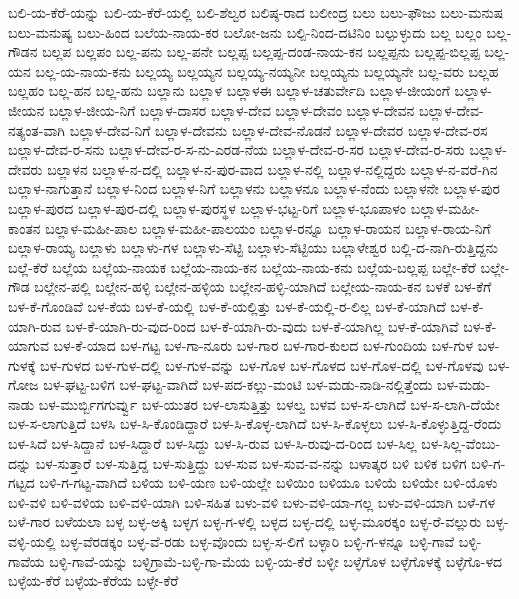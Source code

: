 ಬಲಿ-ಯ-ಕೆರೆ-ಯನ್ನು
ಬಲಿ-ಯ-ಕೆರೆ-ಯಲ್ಲಿ
ಬಲಿ-ಶೆಲ್ವರ
ಬಲಿಷ್ಠ-ರಾದ
ಬಲೀಂದ್ರ
ಬಲು
ಬಲು-ಫೌಜು
ಬಲು-ಮನುಷ
ಬಲು-ಮನುಷ್ಯ
ಬಲು-ಹಿಂದ
ಬಲೆಯ-ನಾಯ-ಕರ
ಬಲೋ-ಜನು
ಬಲ್ಪಿ-ನಿಂದ-ದಟಿನಿಂ
ಬಲ್ಪುಳ್ಳುದು
ಬಲ್ಲ
ಬಲ್ಲಂ
ಬಲ್ಲ-ಗೌಡನ
ಬಲ್ಲಪ
ಬಲ್ಲಪಂ
ಬಲ್ಲ-ಪನು
ಬಲ್ಲ-ಪನೇ
ಬಲ್ಲಪ್ಪ
ಬಲ್ಲಪ್ಪ-ದಂಡ-ನಾಯ-ಕನ
ಬಲ್ಲಪ್ಪನು
ಬಲ್ಲಪ್ಪ-ಬಿಲ್ಲಪ್ಪ
ಬಲ್ಲ-ಯನ
ಬಲ್ಲ-ಯ-ನಾಯ-ಕನು
ಬಲ್ಲಯ್ಯ
ಬಲ್ಲಯ್ಯನ
ಬಲ್ಲಯ್ಯ-ನಯ್ಯನೀ
ಬಲ್ಲಯ್ಯನು
ಬಲ್ಲಯ್ಯನೇ
ಬಲ್ಲ-ವರು
ಬಲ್ಲಹ
ಬಲ್ಲಹಂ
ಬಲ್ಲ-ಹನ
ಬಲ್ಲ-ಹನು
ಬಲ್ಲಾನು
ಬಲ್ಲಾಳ
ಬಲ್ಲಾಳಈ
ಬಲ್ಲಾಳ-ಚತುರ್ವೇದಿ
ಬಲ್ಲಾಳ-ಜೀಯಂಗೆ
ಬಲ್ಲಾಳ-ಜೀಯನ
ಬಲ್ಲಾಳ-ಜೀಯ-ನಿಗೆ
ಬಲ್ಲಾಳ-ದಾಸರ
ಬಲ್ಲಾಳ-ದೇವ
ಬಲ್ಲಾಳ-ದೇವಂ
ಬಲ್ಲಾಳ-ದೇವನ
ಬಲ್ಲಾಳ-ದೇವ-ನತ್ಯಂತ-ವಾಗಿ
ಬಲ್ಲಾಳ-ದೇವ-ನಿಗೆ
ಬಲ್ಲಾಳ-ದೇವನು
ಬಲ್ಲಾಳ-ದೇವ-ನೊಡನೆ
ಬಲ್ಲಾಳ-ದೇವರ
ಬಲ್ಲಾಳ-ದೇವ-ರಸ
ಬಲ್ಲಾಳ-ದೇವ-ರ-ಸನು
ಬಲ್ಲಾಳ-ದೇವ-ರ-ಸ-ನು-ಎರಡ-ನೆಯ
ಬಲ್ಲಾಳ-ದೇವ-ರ-ಸರ
ಬಲ್ಲಾಳ-ದೇವ-ರ-ಸರು
ಬಲ್ಲಾಳ-ದೇವರು
ಬಲ್ಲಾಳನ
ಬಲ್ಲಾಳ-ನ-ದಲ್ಲಿ
ಬಲ್ಲಾಳ-ನ-ಪುರ-ವಾದ
ಬಲ್ಲಾಳ-ನಲ್ಲಿ
ಬಲ್ಲಾಳ-ನಲ್ಲಿದ್ದರು
ಬಲ್ಲಾಳ-ನ-ವರೆ-ಗಿನ
ಬಲ್ಲಾಳ-ನಾಗುತ್ತಾನೆ
ಬಲ್ಲಾಳ-ನಿಂದ
ಬಲ್ಲಾಳ-ನಿಗೆ
ಬಲ್ಲಾಳನು
ಬಲ್ಲಾಳನೂ
ಬಲ್ಲಾಳ-ನೆಂದು
ಬಲ್ಲಾಳನೇ
ಬಲ್ಲಾಳ-ಪುರ
ಬಲ್ಲಾಳ-ಪುರದ
ಬಲ್ಲಾಳ-ಪುರ-ದಲ್ಲಿ
ಬಲ್ಲಾಳ-ಪುರಸ್ಥಳ
ಬಲ್ಲಾಳ-ಭಟ್ಟ-ರಿಗೆ
ಬಲ್ಲಾಳ-ಭೂಪಾಳಂ
ಬಲ್ಲಾಳ-ಮಹೀ-ಕಾಂತನ
ಬಲ್ಲಾಳ-ಮಹೀ-ಪಾಲ
ಬಲ್ಲಾಳ-ಮಹೀ-ಪಾಲಯಂ
ಬಲ್ಲಾಳ-ರನ್ನೂ
ಬಲ್ಲಾಳ-ರಾಯನ
ಬಲ್ಲಾಳ-ರಾಯ-ನಿಗೆ
ಬಲ್ಲಾಳ-ರಾಯ್ಯ
ಬಲ್ಲಾಳು
ಬಲ್ಲಾಳು-ಗಳ
ಬಲ್ಲಾಳು-ಸೆಟ್ಟಿ
ಬಲ್ಲಾಳು-ಸೆಟ್ಟಿಯು
ಬಲ್ಲಾಳೇಶ್ವರ
ಬಲ್ಲಿ-ದ-ನಾಗಿ-ರುತ್ತಿದ್ದನು
ಬಲ್ಲೆ-ಕೆರೆ
ಬಲ್ಲೆಯ
ಬಲ್ಲೆಯ-ನಾಯಕ
ಬಲ್ಲೆಯ-ನಾಯ-ಕನ
ಬಲ್ಲೆಯ-ನಾಯ-ಕನು
ಬಲ್ಲೆಯ-ಬಲ್ಲಪ್ಪ
ಬಲ್ಲೇ-ಕೆರೆ
ಬಲ್ಲೇ-ಗೌಡ
ಬಲ್ಲೇನ-ಪಲ್ಲಿ
ಬಲ್ಲೇನ-ಹಳ್ಳಿ
ಬಲ್ಲೇನ-ಹಳ್ಳಿಯ
ಬಲ್ಲೇನ-ಹಳ್ಳಿ-ಯಾಗಿದೆ
ಬಲ್ಲೇಯ-ನಾಯ-ಕನ
ಬಳಕೆ
ಬಳ-ಕೆಗೆ
ಬಳ-ಕೆ-ಗೊಂಡಿವೆ
ಬಳ-ಕೆಯ
ಬಳ-ಕೆ-ಯಲ್ಲಿ
ಬಳ-ಕೆ-ಯಲ್ಲಿತ್ತು
ಬಳ-ಕೆ-ಯಲ್ಲಿ-ರ-ಲಿಲ್ಲ
ಬಳ-ಕೆ-ಯಾಗಿದೆ
ಬಳ-ಕೆ-ಯಾಗಿ-ರುವ
ಬಳ-ಕೆ-ಯಾಗಿ-ರು-ವುದ-ರಿಂದ
ಬಳ-ಕೆ-ಯಾಗಿ-ರು-ವುದು
ಬಳ-ಕೆ-ಯಾಗಿಲ್ಲ
ಬಳ-ಕೆ-ಯಾಗಿವೆ
ಬಳ-ಕೆ-ಯಾಗುವ
ಬಳ-ಕೆ-ಯಾದ
ಬಳ-ಗಟ್ಟ
ಬಳ-ಗಾ-ನೂರು
ಬಳ-ಗಾರ
ಬಳ-ಗಾರ-ಕುಲದ
ಬಳ-ಗುಂದಿಯ
ಬಳ-ಗುಳ
ಬಳ-ಗುಳಕ್ಕೆ
ಬಳ-ಗುಳದ
ಬಳ-ಗುಳ-ದಲ್ಲಿ
ಬಳ-ಗುಳ-ವನ್ನು
ಬಳ-ಗೊಳ
ಬಳ-ಗೊಳದ
ಬಳ-ಗೊಳ-ದಲ್ಲಿ
ಬಳ-ಗೊಳವು
ಬಳ-ಗೋಜ
ಬಳ-ಘಟ್ಟ-ಬಳಿಗ
ಬಳ-ಘಟ್ಟ-ವಾಗಿದೆ
ಬಳ-ಪದ-ಕಲ್ಲು-ಮಂಟಿ
ಬಳ-ಮಡು-ನಾಡಿ-ನಲ್ಲಿತ್ತೆಂದು
ಬಳ-ಮಡು-ನಾಡು
ಬಳ-ಮುರ್ಬ್ಬಿಗಗುರ್ವ್ವು
ಬಳ-ಯುತರ
ಬಳ-ಲಾಸುತ್ತಿತ್ತು
ಬಳಲ್ವ
ಬಳವ
ಬಳ-ಸ-ಲಾಗಿದೆ
ಬಳ-ಸ-ಲಾಗಿ-ದೆಯೇ
ಬಳ-ಸ-ಲಾಗುತ್ತಿದೆ
ಬಳಸಿ
ಬಳ-ಸಿ-ಕೊಂಡಿದ್ದಾರೆ
ಬಳ-ಸಿ-ಕೊಳ್ಳ-ಲಾಗಿದೆ
ಬಳ-ಸಿ-ಕೊಳ್ಳಲು
ಬಳ-ಸಿ-ಕೊಳ್ಳುತ್ತಿದ್ದ-ರೆಂದು
ಬಳ-ಸಿದೆ
ಬಳ-ಸಿದ್ದಾನೆ
ಬಳ-ಸಿದ್ದಾರೆ
ಬಳ-ಸಿದ್ದು
ಬಳ-ಸಿ-ರುವ
ಬಳ-ಸಿ-ರುವು-ದ-ರಿಂದ
ಬಳ-ಸಿಲ್ಲ
ಬಳ-ಸಿಲ್ಲ-ವೆಂಬು-ದನ್ನು
ಬಳ-ಸುತ್ತಾರೆ
ಬಳ-ಸುತ್ತಿದ್ದ
ಬಳ-ಸುತ್ತಿದ್ದು
ಬಳ-ಸುವ
ಬಳ-ಸುವ-ವ-ನನ್ನು
ಬಳಾತ್ಕರ
ಬಳಿ
ಬಳಿಕ
ಬಳಿಗ
ಬಳಿ-ಗ-ಗಟ್ಟದ
ಬಳಿ-ಗ-ಗಟ್ಟ-ವಾಗಿದೆ
ಬಳಿಯ
ಬಳಿ-ಯಣ
ಬಳಿ-ಯಲ್ಲೇ
ಬಳಿಯಿಂ
ಬಳಿಯೂ
ಬಳಿಯೆ
ಬಳಿಯೇ
ಬಳಿ-ಯೊಳು
ಬಳಿ-ವಳಿ
ಬಳಿ-ವಳಿಯ
ಬಳಿ-ವಳಿ-ಯಾಗಿ
ಬಳಿ-ಸಹಿತ
ಬಳು-ವಳಿ
ಬಳು-ವಳಿ-ಯಾ-ಗಲ್ಲ
ಬಳು-ವಳಿ-ಯಾಗಿ
ಬಳೆ-ಗಳ
ಬಳೆ-ಗಾರ
ಬಳೆಯಲಾ
ಬಳ್ಳ
ಬಳ್ಳ-ಅಕ್ಕಿ
ಬಳ್ಳಗ
ಬಳ್ಳ-ಗ-ಳಲ್ಲಿ
ಬಳ್ಳದ
ಬಳ್ಳ-ದಲ್ಲಿ
ಬಳ್ಳ-ಮೂರಕ್ಕಂ
ಬಳ್ಳ-ರೆ-ವಲ್ಲುರು
ಬಳ್ಳ-ವಳ್ಳಿ-ಯಲ್ಲಿ
ಬಳ್ಳ-ವೆರಡಕ್ಕಂ
ಬಳ್ಳ-ವೆ-ರಡು
ಬಳ್ಳ-ವೊಂದು
ಬಳ್ಳ-ಸ-ಲಿಗೆ
ಬಳ್ಳಾರಿ
ಬಳ್ಳಿ-ಗ-ಳನ್ನೂ
ಬಳ್ಳಿ-ಗಾವೆ
ಬಳ್ಳಿ-ಗಾವೆಯ
ಬಳ್ಳಿ-ಗಾವೆ-ಯನ್ನು
ಬಳ್ಳಿಗ್ರಾಮೆ-ಬಳ್ಳಿ-ಗಾ-ಮೆಯ
ಬಳ್ಳಿ-ಯ-ಕೆರೆ
ಬಳ್ಳೀ
ಬಳ್ಳೆಗೊಳ
ಬಳ್ಳೆಗೊಳಕ್ಕೆ
ಬಳ್ಳೆಗೊ-ಳದ
ಬಳ್ಳೆಯ-ಕೆರೆ
ಬಳ್ಳೆಯ-ಕೆರೆಯ
ಬಳ್ಳೇ-ಕೆರೆ
